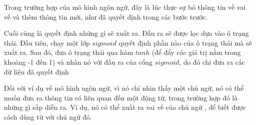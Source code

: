 Trong trường hợp của mô hình ngôn ngữ, đây là lúc thực sự bỏ thông tin về vai vế và thêm thông tin mới, như đã quyết
định trong các bước trước.
\begin{figure}[H]
\end{figure}
Cuối cùng là quyết định những gì sẽ xuất ra. Đầu ra sẽ được lọc dựa vào ô trạng thái. Đầu tiên, chạy một lớp
\(sigmoid\) quyết định phần nào của ô trạng thái mà sẽ xuất ra. Sau đó, đưa ô trạng thái qua hàm
\(tanh\) (để đẩy các giá trị nằm trong khoảng -1 đến 1) và nhân nó với đầu ra của cổng \(sigmoid\), do đó chỉ đưa ra
các dữ liệu đã quyết định

Đối với ví dụ về mô hình ngôn ngữ, vì nó chỉ nhìn thấy một chủ ngữ, nó có thể muốn đưa ra thông tin có liên quan đến
một động từ, trong trường hợp đó là những gì sắp diễn ra. Ví dụ, nó có thể xuất ra vai vế của chủ ngữ , để biết được
cách dùng từ với chủ ngữ đó.